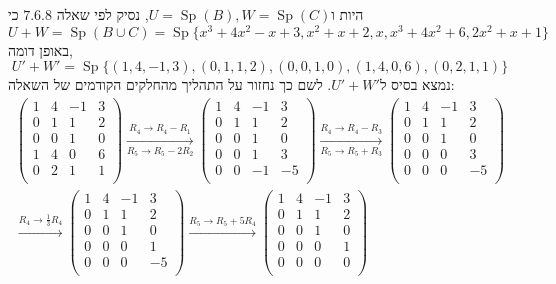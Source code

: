 \documentclass{article}
\DeclareMathOperator\Sp{Sp}
\begin{document}
היות ו$U=\Sp(B), W=\Sp(C)$, נסיק לפי שאלה $7.6.8$ כי
\[
    U+W=\Sp(B\cup C)=\Sp\{x^3+4x^2-x+3, x^2+x+2, x, x^3+4x^2+6, 2x^2+x+1\}
\]
באופן דומה,
\[
    U'+W'=\Sp\{ (1, 4, -1, 3), (0, 1, 1, 2), (0, 0, 1, 0), (1, 4, 0, 6), (0, 2, 1, 1) \}
\]
נמצא בסיס ל$U'+W'$. לשם כך נחזור על התהליך מהחלקים הקודמים של השאלה:
\begin{align*}
    \begin{pmatrix}
        1 & 4 & -1 & 3 \\
        0 & 1 & 1  & 2 \\
        0 & 0 & 1  & 0 \\
        1 & 4 & 0  & 6 \\
        0 & 2 & 1  & 1 \\
    \end{pmatrix}
    \xrightarrow[R_5\rightarrow R_5-2R_2]{R_4\rightarrow R_4-R_1}
    \begin{pmatrix}
        1 & 4 & -1 & 3  \\
        0 & 1 & 1  & 2  \\
        0 & 0 & 1  & 0  \\
        0 & 0 & 1  & 3  \\
        0 & 0 & -1 & -5 \\
    \end{pmatrix}
    \xrightarrow[R_5\rightarrow R_5+R_3]{R_4\rightarrow R_4-R_3}
    \begin{pmatrix}
        1 & 4 & -1 & 3  \\
        0 & 1 & 1  & 2  \\
        0 & 0 & 1  & 0  \\
        0 & 0 & 0  & 3  \\
        0 & 0 & 0  & -5 \\
    \end{pmatrix} \\
    \xrightarrow[]{R_4\rightarrow \frac{1}{3}R_4}
    \begin{pmatrix}
        1 & 4 & -1 & 3  \\
        0 & 1 & 1  & 2  \\
        0 & 0 & 1  & 0  \\
        0 & 0 & 0  & 1  \\
        0 & 0 & 0  & -5 \\
    \end{pmatrix}
    \xrightarrow[]{R_5\rightarrow R_5+5R_4}
    \begin{pmatrix}
        1 & 4 & -1 & 3 \\
        0 & 1 & 1  & 2 \\
        0 & 0 & 1  & 0 \\
        0 & 0 & 0  & 1 \\
        0 & 0 & 0  & 0 \\
    \end{pmatrix}
\end{align*}
\end{document}
